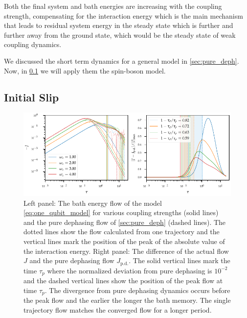 Both the final system and bath energies are increasing with the
coupling strength, compensating for the interaction energy which is
the main mechanism that leads to residual system energy in the steady
state which is further and further away from the ground state, which
would be the steady state of weak coupling dynamics.

We discussed the short term dynamics for a general model in
\cref{sec:pure_deph}.  Now, in \cref{sec:initial-slip-sb} we will
apply them the spin-boson model.


\subsection{Initial Slip}%
\label{sec:initial-slip-sb}
\begin{figure}[htp]
  \centering
  \includegraphics{figs/one_bath_syst/omega_initial_slip}
  \caption{\label{fig:omega_initial_slip} Left panel: The bath energy
    flow of the model \cref{eq:one_qubit_model} for various coupling
    strengths (solid lines) and the pure dephasing flow of
    \cref{sec:pure_deph} (dashed lines). The dotted lines show the
    flow calculated from one trajectory and the vertical lines mark
    the position of the peak of the absolute value of the interaction
    energy. Right panel: The difference of the actual flow \(J\) and
    the pure dephasing flow \(J_\mathrm{p.d.}\). The solid vertical
    lines mark the time \(τ_p\) where the normalized deviation from
    pure dephasing is \(10^{-2}\) and the dashed vertical lines show
    the position of the peak flow at time \(τ_p\). The divergence from
    pure dephasing dynamics occurs before the peak flow and the
    earlier the longer the bath memory. The single trajectory flow
    matches the converged flow for a longer period.}
\end{figure}

